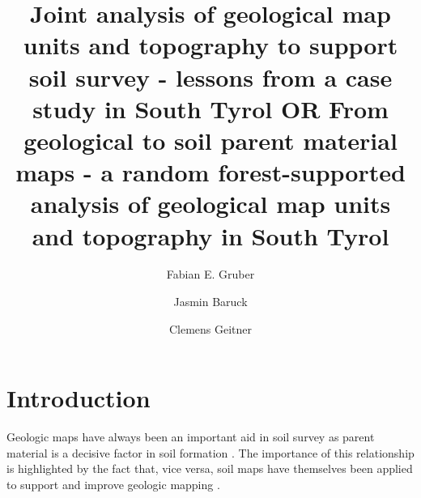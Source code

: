 \documentclass[preprint,12pt,authoryear]{elsarticle}
\begin{document}
\begin{frontmatter}

\title{Joint analysis of geological map units and topography to support soil survey - lessons from a case study in South Tyrol OR From geological to soil parent material maps - a random forest-supported  analysis of geological map units and topography in South Tyrol}



\author[mymainadress]{Fabian E. Gruber}
\author[mymainadress]{Jasmin Baruck}
\author[mymainadress]{Clemens Geitner}



\address[mymainadress]{Institute of Geography, University of Innsbruck, Innrain 52f, 6020 Innsbruck, Austria}

\begin{abstract}

\end{abstract}

\begin{keyword}

\end{keyword}

\end{frontmatter}

\linenumbers

\section{Introduction}

Geologic maps have always been an important aid in soil survey as parent material is a decisive factor in soil formation \citep{Jenny1941}. The importance of this relationship is highlighted by the fact that, vice versa, soil maps have themselves been applied to support and improve geologic mapping \citep{Brevik2015}. 
\end{document}
